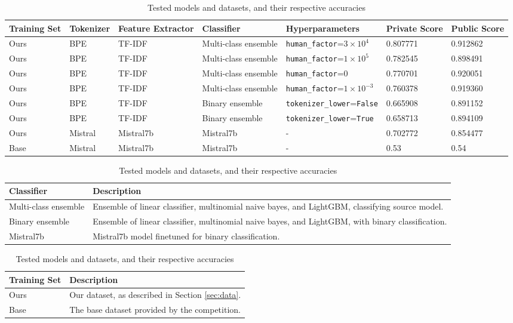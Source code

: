 \documentclass[conference]{IEEEtran}
\begin{document}
\begin{table}[htbp]
  \centering
  \caption{Tested models and datasets, and their respective accuracies}
  \label{tab:models}
  \begin{tabular}{p{1.8cm}p{1.5cm}p{2.3cm}p{2.8cm}p{3.6cm}p{1.6cm}p{1.6cm}}
    \hline
    \textbf{Training Set} & \textbf{Tokenizer} & \textbf{Feature Extractor} & \textbf{Classifier} & \textbf{Hyperparameters} & \textbf{Private Score} & \textbf{Public Score} \\
    \hline
    Ours & BPE & TF-IDF & Multi-class ensemble & \texttt{human\_factor}=$3 \times 10^4$ & 0.807771 & 0.912862 \\
    Ours & BPE & TF-IDF & Multi-class ensemble & \texttt{human\_factor}=$1 \times 10^5$ & 0.782545 & 0.898491 \\
    Ours & BPE & TF-IDF & Multi-class ensemble & \texttt{human\_factor}=$0$ & 0.770701 & 0.920051 \\
    Ours & BPE & TF-IDF & Multi-class ensemble & \texttt{human\_factor}=$1 \times 10^{-3}$ & 0.760378 & 0.919360 \\
    Ours & BPE & TF-IDF & Binary ensemble & \texttt{tokenizer\_lower}=\texttt{False} & 0.665908 & 0.891152 \\
    Ours & BPE & TF-IDF & Binary ensemble & \texttt{tokenizer\_lower}=\texttt{True} & 0.658713 & 0.894109 \\

    Ours & Mistral & Mistral7b & Mistral7b & - & 0.702772 & 0.854477 \\
    Base & Mistral & Mistral7b & Mistral7b & - & 0.53 & 0.54 \\
    \hline
  \end{tabular}

  \vspace{0.5cm}

  \begin{tabular}{ll}
    \hline
    \textbf{Classifier} & \textbf{Description} \\
    \hline
    Multi-class ensemble & Ensemble of linear classifier, multinomial naive bayes, and LightGBM, classifying source model. \\
    Binary ensemble & Ensemble of linear classifier, multinomial naive bayes, and LightGBM, with binary classification. \\
    Mistral7b & Mistral7b model finetuned for binary classification. \\
    \hline
  \end{tabular}

  \vspace{0.5cm}

  \begin{tabular}{ll}
    \hline
    \textbf{Training Set} & \textbf{Description} \\
    \hline
    Ours & Our dataset, as described in Section \ref{sec:data}. \\
    Base & The base dataset provided by the competition. \\
    \hline
  \end{tabular}
\end{table}
\end{document}
